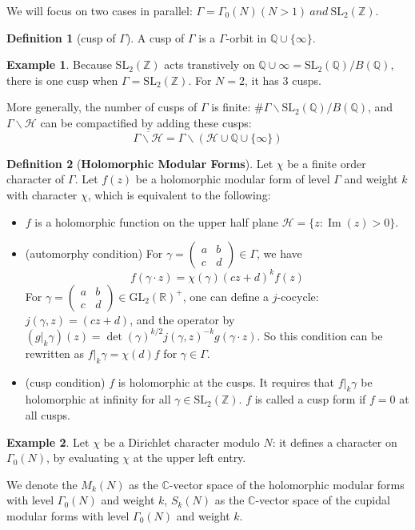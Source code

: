 \documentclass[11pt,english]{smfart}
\theoremstyle{definition}
\newtheorem{definition}{Definition}
\newtheorem{example}{Example}
\theoremstyle{remark}
\begin{document}
We will focus on two cases in parallel: $\Gamma=\Gamma_0(N)(N >1)\ and\ \mathrm{SL}_2(\mathbb{Z}).$
\begin{definition}[cusp of $\Gamma$]
A cusp of $ \Gamma $ is a $ \Gamma $-orbit in $ \mathbb{Q} \cup\{\infty\} $.
\end{definition}
\begin{example}
Because $ \mathrm{S L_{2}}(\mathbb{Z}) $ acts transtively on $ \mathbb{Q} \cup \infty=\mathrm{SL}_{2}(\mathbb{Q}) / B(\mathbb{Q}) $, there is one cusp when $ \Gamma=\mathrm{SL}_{2}(\mathbb{Z}) $.
For $N=2$, it has $3$ cusps.

More generally, the number of cusps of $ \Gamma $ is finite: $ \# \Gamma \backslash \mathrm{SL}_{2}(\mathbb{Q}) / B(\mathbb{Q}) $, and $ \Gamma \backslash \mathcal{H} $ can be compactified by adding these cusps:
\[\overline{\Gamma \backslash \mathcal{H}}=\Gamma \backslash(\mathcal{H} \cup \mathbb{Q} \cup\{\infty\})\]
\end{example}
\begin{definition}[\textbf{Holomorphic Modular Forms}]
Let $\chi$ be a finite order character of $\Gamma$. 
Let $ f(z) $ be a holomorphic modular form of level $\Gamma$ and weight $ k$ with character $\chi$, which is equivalent to the following:
\begin{itemize}
    \item $f $ is a holomorphic function on the upper half plane $ \mathcal{H}=\{z: \operatorname{Im}(z)>0\} $.
    \item (automorphy condition) For $ \gamma= \left(\begin{array}{ll}a & b \\ c & d\end{array}\right) \in \Gamma $, we have
    \[f(\gamma \cdot z )=\chi(\gamma)(c z+d)^{k} f(z)\]
For $ \gamma=\left(\begin{array}{ll}a & b \\ c & d\end{array}\right) \in \mathrm{GL}_{2}(\mathbb{R})^{+} $, one can define a $j$-cocycle: $ j(\gamma, z)=(c z+d) $, and the operator by $ \left(\left.g\right|_{k} \gamma\right)(z)=\operatorname{det}(\gamma)^{k / 2} j(\gamma, z)^{-k} g(\gamma \cdot z) $.
So this condition can be rewritten as $ \left.f\right|_{k} \gamma=\chi(d) f $ for $ \gamma \in \Gamma$.
    \item (cusp condition) $f $ is holomorphic at the cusps. It requires that $ \left.f\right|_{k} \gamma $ be holomorphic at infinity for all $ \gamma \in \mathrm{SL}_{2}(\mathbb{Z}) $. $f$ is called a cusp form if $f=0$ at all cusps.
\end{itemize}
\end{definition}
\begin{example}
Let $\chi$ be a Dirichlet character modulo $N$: it defines a character on $\Gamma_0(N)$, by evaluating $\chi$ at the upper left entry.
\end{example}
We denote the $M_k(N)$ as the $\mathbb{C}$-vector space of the holomorphic modular forms with level $\Gamma_0(N)$ and weight $k$, $S_k(N)$ as the $\mathbb{C}$-vector space of the cupidal modular forms with level $\Gamma_0(N)$ and weight $k$.
\end{document}
